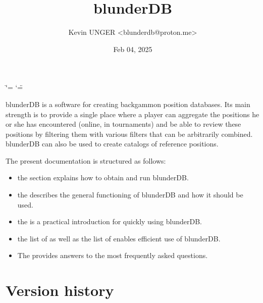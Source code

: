 \documentclass[letterpaper,10pt,english]{sphinxmanual}
\title{blunderDB}
\date{Feb 04, 2025}
\author{Kevin UNGER \textless{}blunderdb@proton.me\textgreater{}}
\begin{document}
\ifdefined\shorthandoff
  \ifnum\catcode`\=\string=\active\shorthandoff{=}\fi
  \ifnum\catcode`\"=\active{}\fi
\fi

\pagestyle{empty}
\sphinxmaketitle
\pagestyle{plain}
\sphinxtableofcontents
\pagestyle{normal}
\label{\detokenize{index::doc}}


\sphinxAtStartPar
blunderDB is a software for creating backgammon position databases. Its main strength is to provide a single place where a player can aggregate the positions he or she has encountered (online, in tournaments) and be able to review these positions by filtering them with various filters that can be arbitrarily combined. blunderDB can also be used to create catalogs of reference positions.

\sphinxAtStartPar
The present documentation is structured as follows:
\begin{itemize}
\item {} 
\sphinxAtStartPar
the  section explains how to obtain and run blunderDB.

\item {} 
\sphinxAtStartPar
the  describes the general functioning of blunderDB and how it should be used.

\item {} 
\sphinxAtStartPar
the  is a practical introduction for quickly using blunderDB.

\item {} 
\sphinxAtStartPar
the list of  as well as the list of  enables efficient use of blunderDB.

\item {} 
\sphinxAtStartPar
The  provides answers to the most frequently asked questions.

\end{itemize}


\chapter{Version history}
\label{\detokenize{index:historique-des-versions}}
\end{document}
